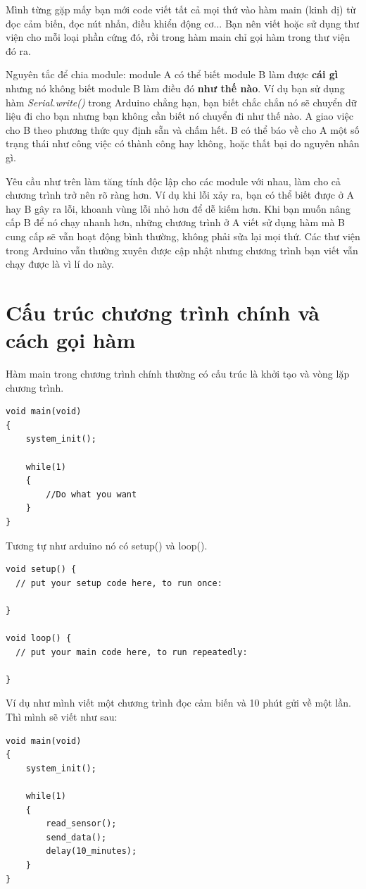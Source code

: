 Mình từng gặp mấy bạn mới code viết tất cả mọi thứ vào hàm main (kinh dị) từ đọc cảm biến, đọc nút nhấn, điều khiển động cơ... Bạn nên viết hoặc sử dụng thư viện cho mỗi loại phần cứng đó, rồi trong hàm main chỉ gọi hàm trong thư viện đó ra.

Nguyên tắc để chia module: module A có thể biết module B làm được \textbf{cái gì} nhưng nó không biết module B làm điều đó \textbf{như thế nào}. Ví dụ bạn sử dụng hàm \textit{Serial.write()} trong Arduino chẳng hạn, bạn biết chắc chắn nó sẽ chuyển dữ liệu đi cho bạn nhưng bạn không cần biết nó chuyển đi như thế nào. A giao việc cho B theo phương thức quy định sẵn và chấm hết. B có thể báo về cho A một số trạng thái như công việc có thành công hay không, hoặc thất bại do nguyên nhân gì.

Yêu cầu như trên làm tăng tính độc lập cho các module với nhau, làm cho cả chương trình trở nên rõ ràng hơn. Ví dụ khi lỗi xảy ra, bạn có thể biết được ở A hay B gây ra lỗi, khoanh vùng lỗi nhỏ hơn để dễ kiếm hơn. Khi bạn muốn nâng cấp B để nó chạy nhanh hơn, những chương trình ở A viết sử dụng hàm mà B cung cấp sẽ vẫn hoạt động bình thường, không phải sửa lại mọi thứ. Các thư viện trong Arduino vẫn thường xuyên được cập nhật nhưng chương trình bạn viết vẫn chạy được là vì lí do này.

\section{Cấu trúc chương trình chính và cách gọi hàm}

Hàm main trong chương trình chính thường có cấu trúc là khởi tạo và vòng lặp chương trình. 
\begin{lstlisting}
void main(void)
{
	system_init();
	
	while(1)
	{
		//Do what you want
	}
}
\end{lstlisting}

Tương tự như arduino nó có setup() và loop().
\begin{lstlisting}
void setup() {
  // put your setup code here, to run once:

}

void loop() {
  // put your main code here, to run repeatedly:

}
\end{lstlisting}

Ví dụ như mình viết một chương trình đọc cảm biến và 10 phút gửi về một lần. Thì mình sẽ viết như sau:
\begin{lstlisting}
void main(void)
{
	system_init();
	
	while(1)
	{
		read_sensor();
		send_data();
		delay(10_minutes);
	}
}
\end{lstlisting}

